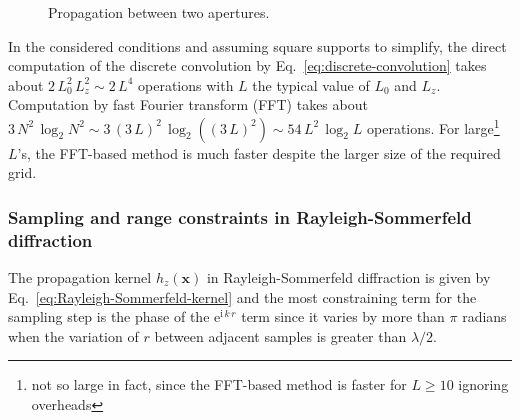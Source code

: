 \documentclass[a4paper]{article}
\newcommand*{\V}[1]{\boldsymbol{#1}}
\newcommand*{\mathe}{\mathrm{e}}
\newcommand*{\mathi}{\mathrm{i}}
\begin{document}
\begin{figure}
  \centering
  \caption{Propagation between two apertures.}
  \label{fig:propagation}
\end{figure}

In the considered conditions and assuming square supports to simplify, the
direct computation of the discrete convolution by
Eq.~\eqref{eq:discrete-convolution} takes about
$2\,L_{0}^{2}\,L_{z}^{2} \sim 2\,L^{4}$ operations with $L$ the typical value
of $L_{0}$ and $L_{z}$. Computation by fast Fourier transform (FFT) takes about
$3\,N^{2}\,\log_{2}N^{2} \sim 3\,(3\,L)^{2}\,\log_{2}((3\,L)^{2}) \sim 54\,L^{2}\,\log_{2}L$
operations. For large\footnote{not so large in fact, since the FFT-based method
  is faster for $L ≥ 10$ ignoring overheads} $L$'s, the FFT-based method is
much faster despite the larger size of the required grid.


\subsubsection{Sampling and range constraints in Rayleigh-Sommerfeld diffraction}
\label{sec:Rayleigh-Sommerfeld-diffraction:sampling-constraint}

The propagation kernel $h_{z}(\V{x})$ in Rayleigh-Sommerfeld diffraction is
given by Eq.~\eqref{eq:Rayleigh-Sommerfeld-kernel} and the most constraining
term for the sampling step is the phase of the $\mathe^{\mathi\,k\,r}$ term
since it varies by more than $π$ radians when the variation of $r$ between
adjacent samples is greater than $λ/2$.
\end{document}
